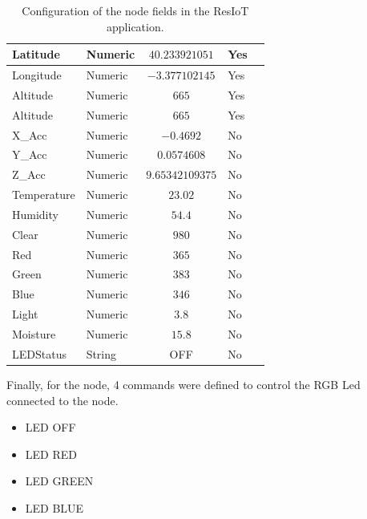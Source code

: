 \begin{itemize}
\begin{table}[H]
\begin{center}
\begin{tabular}{|p{} | p{} |c| p{}| p{}|}
                \hline
                Latitude & Numeric & $40.233921051$ & Yes \\
                \hline
                Longitude & Numeric & $-3.377102145$ & Yes \\
                \hline
                Altitude & Numeric & $665$ & Yes \\
                \hline
                Altitude & Numeric & $665$ & Yes \\
                \hline
                X\_Acc & Numeric & $-0.4692$ & No \\
                \hline
                Y\_Acc & Numeric & $0.0574608$ & No \\
                \hline
                Z\_Acc & Numeric & $9.65342109375$ & No \\
                \hline
                Temperature & Numeric & $23.02$ & No \\
                \hline
                Humidity & Numeric & $54.4$ & No \\
                \hline
                Clear & Numeric & $980$ & No \\
                \hline
                Red & Numeric & $365$ & No \\
                \hline
                Green & Numeric & $383$ & No \\
                \hline
                Blue & Numeric & $346$ & No \\
                \hline
                Light & Numeric & $3.8$ & No \\
                \hline
                Moisture & Numeric & $15.8$ & No \\
                \hline
                LEDStatus & String & OFF & No \\
                \hline
            \end{tabular}
        \end{center}
        \caption{Configuration of the node fields in the ResIoT application.}
        \label{Connections3}
    \end{table}
\end{itemize}

Finally, for the node, 4 commands were defined to control the RGB Led connected to the node.
\begin{itemize}
    \item LED OFF
    \item LED RED
    \item LED GREEN
    \item LED BLUE
\end{itemize}
